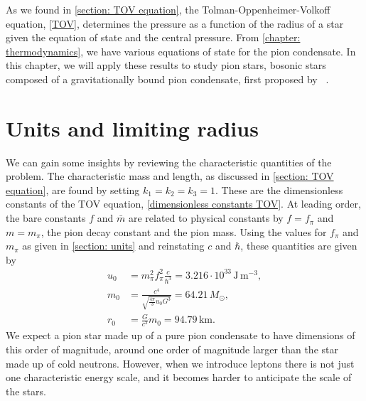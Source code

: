 As we found in \autoref{section: TOV equation}, the Tolman-Oppenheimer-Volkoff equation, \autoref{TOV}, determines the pressure as a function of the radius of a star given the equation of state and the central pressure.
From \autoref{chapter: thermodynamics}, we have various equations of state for the pion condensate.
In this chapter, we will apply these results to study pion stars, bosonic stars composed of a gravitationally bound pion condensate, first proposed by \citeauthor{brandtNewClassCompact2018}~\autocite{brandtNewClassCompact2018}.



\section{Units and limiting radius}

We can gain some insights by reviewing the characteristic quantities of the problem.
The characteristic mass and length, as discussed in \autoref{section: TOV equation}, are found by setting $k_1 = k_2 = k_3 = 1$.
These are the dimensionless constants of the TOV equation, \autoref{dimensionless constants TOV}.
At leading order, the bare constants $f$ and $\bar m$ are related to physical constants by $f = f_\pi$ and $m = m_\pi$, the pion decay constant and the pion mass.
Using the values for $f_\pi$ and $m_\pi$ as given in \autoref{section: units} and reinstating $c$ and $\hbar$, these quantities are given by
%
\begin{align}
    u_0 & =m_\pi^2 f_\pi^2 \frac{c}{\hbar^3}
    = 3.216\cdot 10^{33} \, \text{J}\,\text{m}^{-3}, \\
    m_0 & = \frac{c^4}{\sqrt{\frac{4 \pi}{ 3} u_0 G^3}} = 64.21\, M_\odot, \\
    r_0 & = \frac{G}{c^2} m_0 = 94.79 \, \text{km}.
\end{align}
%
We expect a pion star made up of a pure pion condensate to have dimensions of this order of magnitude, around one order of magnitude larger than the star made up of cold neutrons.
However, when we introduce leptons there is not just one characteristic energy scale, and it becomes harder to anticipate the scale of the stars.


